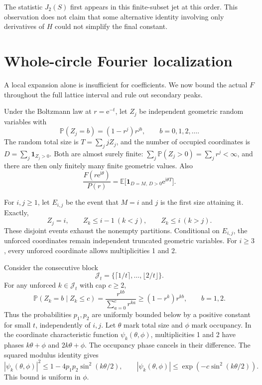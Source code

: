 \documentclass[11pt,letterpaper]{article}
\numberwithin{equation}{section}
\theoremstyle{definition}\newtheorem{definition}[theorem]{Definition}
\theoremstyle{remark}\newtheorem{remark}[theorem]{Remark}
\newcommand{\E}{\mathbb E}
\newcommand{\Prob}{\mathbb P}
\newcommand{\ii}{\mathrm i}
\newcommand{\ee}{\mathrm e}
\begin{document}
The statistic $J_2(S)$ first appears in this finite-subset jet at this order. This observation does not claim that some alternative identity involving only derivatives of $H$ could not simplify the final constant.

\section{Whole-circle Fourier localization}\label{dmm:sec:fourier}
A local expansion alone is insufficient for coefficients. We now bound the actual $F$ throughout the full lattice interval and rule out secondary peaks.

Under the Boltzmann law at $r=\ee^{-t}$, let $Z_j$ be independent geometric random variables with
\begin{equation}\label{dmm:eq:geom}
\Prob(Z_j=b)=(1-r^j)r^{jb},\qquad b=0,1,2,\ldots.
\end{equation}
The random total size is $T=\sum_jjZ_j$, and the number of occupied coordinates is $D=\sum_j\mathbf1_{Z_j>0}$. Both are almost surely finite: $\sum_j\Prob(Z_j>0)=\sum_jr^j<\infty$, and there are then only finitely many finite geometric values. Also
\begin{equation}\label{dmm:eq:Fexpect}
\frac{F(r\ee^{\ii\theta})}{P(r)}
=\E\bigl[\mathbf1_{D=M,\,D>0}\ee^{\ii\theta T}\bigr].
\end{equation}

For $i,j\ge1$, let $E_{i,j}$ be the event that $M=i$ and $j$ is the first size attaining it. Exactly,
\begin{equation}\label{dmm:eq:firstattain}
Z_j=i,\qquad Z_k\le i-1\ (k<j),\qquad Z_k\le i\ (k>j).
\end{equation}
These disjoint events exhaust the nonempty partitions. Conditional on $E_{i,j}$, the unforced coordinates remain independent truncated geometric variables. For $i\ge3$, every unforced coordinate allows multiplicities 1 and 2.

Consider the consecutive block
\begin{equation}\label{dmm:eq:block}
\mathcal J_t=\{\lceil1/t\rceil,\ldots,\lfloor2/t\rfloor\}.
\end{equation}
For any unforced $k\in\mathcal J_t$ with cap $c\ge2$,
\[
\Prob(Z_k=b\mid Z_k\le c)
=\frac{r^{kb}}{\sum_{a=0}^{c}r^{ka}}
\ge(1-r^k)r^{kb},\qquad b=1,2.
\]
Thus the probabilities $p_1,p_2$ are uniformly bounded below by a positive constant for small $t$, independently of $i,j$. Let $\theta$ mark total size and $\phi$ mark occupancy. In the coordinate characteristic function $\psi_k(\theta,\phi)$, multiplicities 1 and 2 have phases $k\theta+\phi$ and $2k\theta+\phi$. The occupancy phase cancels in their difference. The squared modulus identity gives
\begin{equation}\label{dmm:eq:coordbound}
|\psi_k(\theta,\phi)|^2\le1-4p_1p_2\sin^2(k\theta/2),
\qquad
|\psi_k(\theta,\phi)|\le\exp(-c\sin^2(k\theta/2)).
\end{equation}
This bound is uniform in $\phi$.
\end{document}
